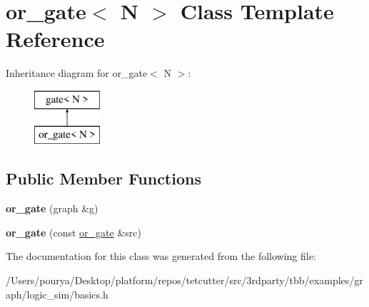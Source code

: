 \hypertarget{classor__gate}{}\section{or\+\_\+gate$<$ N $>$ Class Template Reference}
\label{classor__gate}
Inheritance diagram for or\+\_\+gate$<$ N $>$\+:\begin{figure}[H]
\begin{center}
\leavevmode
\includegraphics[height=2.000000cm]{classor__gate}
\end{center}
\end{figure}
\subsection*{Public Member Functions}
\begin{DoxyCompactItemize}
\item 
\hypertarget{classor__gate_afcc69808374e1556457ffbc56d0766c0}{}{\bfseries or\+\_\+gate} (graph \&g)\label{classor__gate_afcc69808374e1556457ffbc56d0766c0}

\item 
\hypertarget{classor__gate_a710cfd557166beaaea75ad800bb9340c}{}{\bfseries or\+\_\+gate} (const \hyperlink{classor__gate}{or\+\_\+gate} \&src)\label{classor__gate_a710cfd557166beaaea75ad800bb9340c}

\end{DoxyCompactItemize}


The documentation for this class was generated from the following file\+:\begin{DoxyCompactItemize}
\item 
/\+Users/pourya/\+Desktop/platform/repos/tetcutter/src/3rdparty/tbb/examples/graph/logic\+\_\+sim/basics.\+h\end{DoxyCompactItemize}
